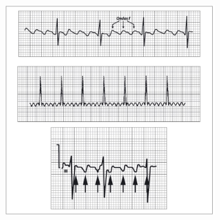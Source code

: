 \begin{center}
\label{fig:introducao-exemplo2}
\includegraphics[width=0.7\textwidth]{Illustrations/ondas-f.jpg}
\vspace{1em}
\end{center}
